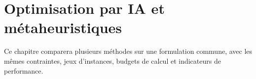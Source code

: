 \chapter{Optimisation par IA et métaheuristiques}
\label{chap:metaheuristiques}

Ce chapitre comparera plusieurs méthodes sur une formulation commune, avec les mêmes contraintes, jeux d'instances, budgets de calcul et indicateurs de performance.




